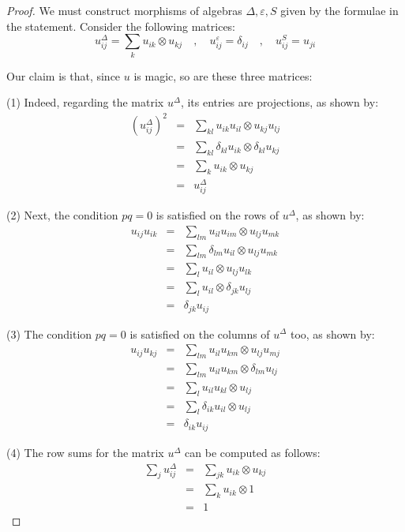 \documentclass[12pt]{amsbook}
\begin{document}
\begin{proof}
We must construct morphisms of algebras $\Delta,\varepsilon,S$ given by the formulae in the statement. Consider the following matrices:
$$u^\Delta_{ij}=\sum_ku_{ik}\otimes u_{kj}\quad,\quad 
u^\varepsilon_{ij}=\delta_{ij}\quad,\quad 
u^S_{ij}=u_{ji}$$

Our claim is that, since $u$ is magic, so are these three matrices:

\medskip

(1) Indeed, regarding the matrix $u^\Delta$, its entries are projections, as shown by:
\begin{eqnarray*}
(u_{ij}^\Delta)^2
&=&\sum_{kl}u_{ik}u_{il}\otimes u_{kj}u_{lj}\\
&=&\sum_{kl}\delta_{kl}u_{ik}\otimes\delta_{kl}u_{kj}\\
&=&\sum_ku_{ik}\otimes u_{kj}\\
&=&u_{ij}^\Delta
\end{eqnarray*}

(2) Next, the condition $pq=0$ is satisfied on the rows of $u^\Delta$, as shown by:
\begin{eqnarray*}
u_{ij}u_{ik}
&=&\sum_{lm}u_{il}u_{im}\otimes u_{lj}u_{mk}\\
&=&\sum_{lm}\delta_{lm}u_{il}\otimes u_{lj}u_{mk}\\
&=&\sum_lu_{il}\otimes u_{lj}u_{lk}\\
&=&\sum_lu_{il}\otimes\delta_{jk}u_{lj}\\
&=&\delta_{jk}u_{ij}
\end{eqnarray*}

(3) The condition $pq=0$ is satisfied on the columns of $u^\Delta$ too, as shown by:
\begin{eqnarray*}
u_{ij}u_{kj}
&=&\sum_{lm}u_{il}u_{km}\otimes u_{lj}u_{mj}\\
&=&\sum_{lm}u_{il}u_{km}\otimes\delta_{lm}u_{lj}\\
&=&\sum_lu_{il}u_{kl}\otimes u_{lj}\\
&=&\sum_l\delta_{ik}u_{il}\otimes u_{lj}\\
&=&\delta_{ik}u_{ij}
\end{eqnarray*}

(4) The row sums for the matrix $u^\Delta$ can be computed as follows:
\begin{eqnarray*}
\sum_ju_{ij}^\Delta
&=&\sum_{jk}u_{ik}\otimes u_{kj}\\
&=&\sum_ku_{ik}\otimes 1\\
&=&1
\end{eqnarray*}


\end{proof}
\end{document}
